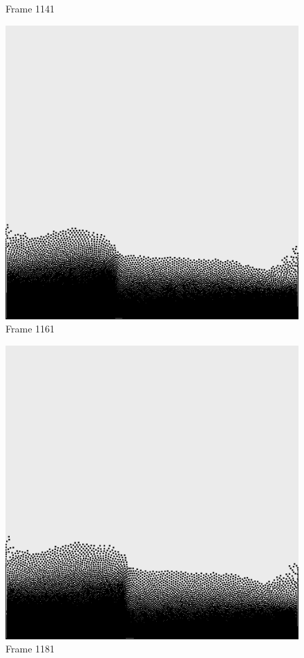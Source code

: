 \documentclass[a4paper, 12pt, oneside]{book}
\begin{document}
\begin{figure}[!ht]
\begin{center}
            Frame 1141
        \end{center}
    \endminipage
    \hfill
        \begin{center}
            \includegraphics[width=\linewidth]{images/test_case_2/1161.png}
            Frame 1161
        \end{center}
    \endminipage
    \hfill
        \begin{center}
            \includegraphics[width=\linewidth]{images/test_case_2/1181.png}
            Frame 1181
        \end{center}
    \endminipage
    \hfill
\end{figure}
\end{document}
